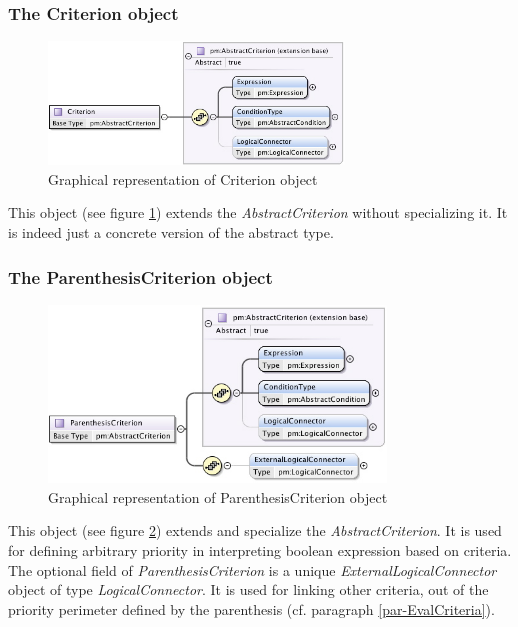 \documentclass[a4paper,11pt] {ivoa}
\begin{document}
\subsubsection{The Criterion object}
\begin{figure}[htbp]
\begin{center}
\includegraphics[width=0.7\textwidth]{pictures/Criterion.jpg} 
\caption{Graphical representation of Criterion object}
\label{Pic-Criterion}
\end{center}
\end{figure}
This object (see figure \ref{Pic-Criterion}) extends the  {\it AbstractCriterion} without
specializing it. It is indeed just a concrete version of the abstract type.

\subsubsection{The ParenthesisCriterion object}
\begin{figure}[htbp]
\begin{center}
\includegraphics[width=0.8\textwidth]{pictures/ParenthesisCriterion.jpg} 
\caption{Graphical representation of ParenthesisCriterion object}
\label{Pic-ParenthesisCriterion}
\end{center}
\end{figure}
This object (see figure \ref{Pic-ParenthesisCriterion}) extends and specialize the  {\it
AbstractCriterion}. It is used for defining arbitrary priority in interpreting boolean expression
based on criteria.
The optional field of {\it ParenthesisCriterion} is a unique {\it ExternalLogicalConnector} object
of type {\it LogicalConnector}. It is used for linking other criteria, out of the priority
perimeter defined by the parenthesis (cf.  paragraph \ref{par-EvalCriteria}).
\end{document}
